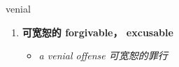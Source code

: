
\begin{frame}
{\huge venial}
\begin{center}
\begin{enumerate}\Large
  \item \textbf{可宽恕的 forgivable， excusable}
  \begin{itemize}
    \item \em{\Large{a venial offense 可宽恕的罪行}}
  \end{itemize}
\end{enumerate}
\end{center}
\end{frame}
